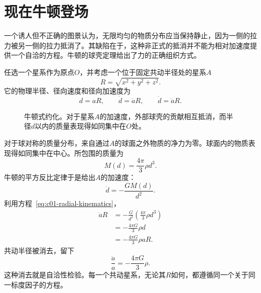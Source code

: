 \section{现在牛顿登场}

一个诱人但不正确的图景认为，无限均匀的物质分布应当保持静止，因为一侧的拉力被另一侧的拉力抵消了。其缺陷在于，这种非正式的抵消并不能为相对加速度提供一个自洽的方程。牛顿的球壳定理给出了力的正确组织方式。

任选一个星系作为原点\(O\)，并考虑一个位于固定共动半径处的星系\(A\)
\begin{equation}
R=\sqrt{x^2+y^2+z^2}.
\end{equation}
它的物理半径、径向速度和径向加速度为
\begin{equation}
d=aR,
\qquad
\dot d=\dot a R,
\qquad
\ddot d=\ddot a R.
\label{eq:c01-radial-kinematics}
\end{equation}

\begin{figure}[ht]
\centering
{}
\caption{牛顿式约化。对于星系\(A\)的加速度，外部球壳的贡献相互抵消，而半径\(d\)以内的质量表现得如同集中在\(O\)处。}
\label{fig:c01-newton-sphere}
\end{figure}

对于球对称的质量分布，来自通过\(A\)的球面之外物质的净力为零。球面内的物质表现得如同集中在中心。所包围的质量为
\begin{equation}
M(d)=\frac{4\pi}{3}\rho d^3.
\label{eq:c01-enclosed-mass}
\end{equation}
牛顿的平方反比定律于是给出\(A\)的加速度：
\begin{equation}
\ddot d=-\frac{GM(d)}{d^2}.
\end{equation}
利用方程~\eqref{eq:c01-radial-kinematics}，
\begin{align}
\ddot a R
&=-\frac{G}{d^2}\left(\frac{4\pi}{3}\rho d^3\right) \\
&=-\frac{4\pi G}{3}\rho d \\
&=-\frac{4\pi G}{3}\rho aR.
\end{align}
共动半径被消去，留下
\begin{equation}
\boxed{\frac{\ddot a}{a}=-\frac{4\pi G}{3}\rho.}
\label{eq:c01-acceleration}
\end{equation}
这种消去就是自洽性检验。每一个共动星系，无论其\(R\)如何，都遵循同一个关于同一标度因子的方程。

